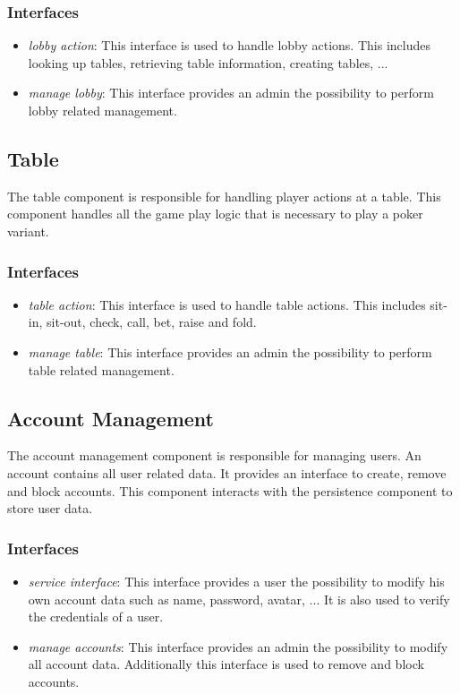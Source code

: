 \documentclass[a4paper,11pt]{report}
\begin{document}
\subsubsection{Interfaces}
\begin{itemize}
\item \emph{lobby action}: This interface is used to handle lobby actions. This includes looking up tables, retrieving table information, creating tables, ...
\item \emph{manage lobby}: This interface provides an admin the possibility to perform lobby related management.
\end{itemize}

\subsection{Table}
The table component is responsible for handling player actions at a table. This component handles all the game play logic that is necessary to play a poker variant.
\subsubsection{Interfaces}
\begin{itemize}
\item \emph{table action}: This interface is used to handle table actions. This includes sit-in, sit-out, check,  call, bet, raise and fold.
\item \emph{manage table}: This interface provides an admin the possibility to perform table related management.
\end{itemize}

\subsection{Account Management}
The account management component is responsible for managing users. An account contains all user related data. It provides an interface to create, remove and block accounts. This component interacts with the persistence component to store user data.
\subsubsection{Interfaces}
\begin{itemize}
\item \emph{service interface}: This interface provides a user the possibility to modify his own account data such as name, password, avatar, ... It is also used to verify the credentials of a user.
\item \emph{manage accounts}: This interface provides an admin the possibility to modify all account data. Additionally this interface is used to remove and block accounts. 
\end{itemize}
\end{document}
